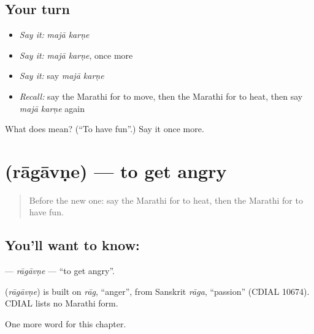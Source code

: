 \subsection*{Your turn}
\begin{itemize}
\raggedright
  \item \emph{Say it:} \emph{majā karṇe}
  \item \emph{Say it:} \emph{majā karṇe}, once more
  \item \emph{Say it:} say \emph{majā karṇe}
  \item \emph{Recall:} say the Marathi for to move, then the Marathi for to heat, then say \emph{majā karṇe} again
\end{itemize}

\begin{tcolorbox}[breakable,colback=teal!4,colframe=teal!35!black,title={Before you move on}]
What does   mean? (\textquotedblleft{}To have fun\textquotedblright{}.) Say it once more.
\end{tcolorbox}
\section[\texorpdfstring{\mr{रागावणे} (rāgāvṇe)}{रागावणे (rāgāvṇe)}]{ (rāgāvṇe) — to get angry}

\label{lesson:MR-C252-ragavne}



\begin{quote}
Before the new one: say the Marathi for to heat, then the Marathi for to have fun.
\end{quote}

\subsection*{You'll want to know: }
\textbf{} — \emph{rāgāvṇe} — \textquotedblleft{}to get angry\textquotedblright{}.

\begin{cousinweb}
\textbf{} (\emph{rāgāvṇe}) is built on \emph{rāg}, \textquotedblleft{}anger\textquotedblright{}, from Sanskrit \emph{rāga}, \textquotedblleft{}passion\textquotedblright{} (CDIAL 10674). CDIAL lists no Marathi form.
\end{cousinweb}

\begin{grammarlens}[title={What you've built}]
One more word for this chapter.
\end{grammarlens}

